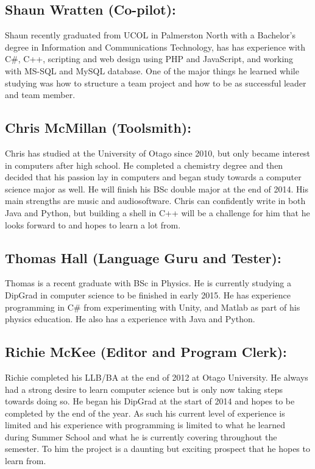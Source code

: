 \documentclass[a4paper,12pt]{article}
\begin{document}
\subsection*{Shaun Wratten (Co-pilot):}
Shaun recently graduated from UCOL in Palmerston North with a Bachelor’s degree in Information and Communications Technology,
has has experience with
C\#, C++, scripting and web design using PHP and JavaScript, and working with MS-SQL and MySQL database. One of the major things he learned while studying was how to
structure a team project and how to be as successful leader and team member.

\subsection*{Chris McMillan (Toolsmith):}
Chris has studied at the University of Otago since 2010, but only became interest in computers after high school. He completed a chemistry degree and then decided that his passion lay in computers and began study towards a computer science major as well. He will finish his BSc double major at the end of 2014. His main strengths are music and audiosoftware. Chris can confidently write in both Java and Python, but building a shell in C++ will be a challenge for him that he looks forward to and hopes to learn a lot from.

\subsection*{Thomas Hall (Language Guru and Tester):}
Thomas is a recent graduate with BSc in Physics. He is currently studying a DipGrad in computer science to be finished in early 2015. He has experience programming in C\# from experimenting with Unity, and Matlab as part of his physics education. He also has a experience with Java and Python.

\subsection*{Richie McKee (Editor and Program Clerk):}
Richie completed his LLB/BA at the end of 2012 at Otago University. He always had a strong desire to learn computer science but is only now taking steps towards doing so. He began his DipGrad at the start of 2014 and hopes to be completed by the end of the year. As such his current level of experience is limited and his experience with programming is limited to what he learned during Summer School and what he is currently covering throughout the semester. To him the project is a daunting but exciting prospect that he hopes to learn from.
\end{document}
